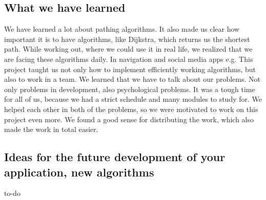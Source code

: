 \documentclass[a4paper,12pt]{article}
\begin{document}
\subsection{What we have learned}
We have learned a lot about pathing algorithms. It also made us clear how important it is to have algorithms, like Dijkstra, which returns us the shortest path. While working out, where we could use it in real life, we realized that we are facing these algorithms daily.  In navigation and social media apps e.g.
This project taught us not only how to implement efficiently working algorithms, but also to work in a team. We learned that we have to talk about our problems. Not only problems in development, also psychological problems. It was a tough time for all of us, because we had a strict schedule and many modules to study for. We helped each other in both of the problems, so we were motivated to work on this project even more. We found a good sense for distributing the work, which also made the work in total easier.\\

\subsection{Ideas for the future development of your application, new algorithms}
to-do


\end{document}
